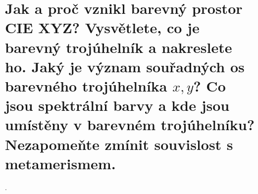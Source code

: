 \section{Jak a proč vznikl barevný prostor CIE XYZ? Vysvětlete, co je barevný trojúhelník a nakreslete ho. Jaký je 
význam souřadných os barevného trojúhelníka \texorpdfstring{$x, y$}{x,y}? Co jsou spektrální barvy a kde jsou umístěny 
v barevném trojúhelníku? Nezapomeňte zmínit souvislost s metamerismem.}.